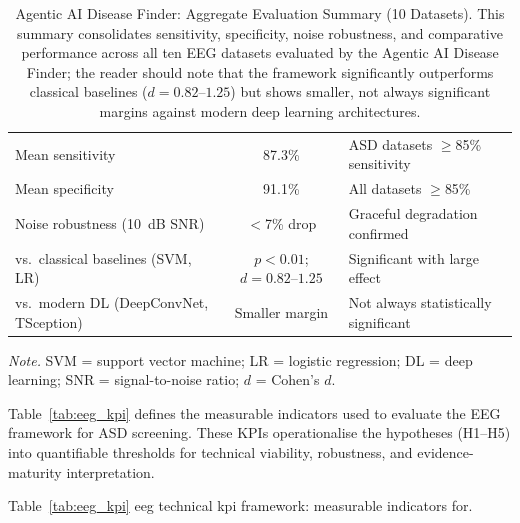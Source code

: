 \begin{table}[!htbp]
\tablestripes\tablefontsize
\caption[Agentic AI Disease Finder: Aggregate Evaluation Summary]{Agentic AI Disease Finder: Aggregate Evaluation Summary (10 Datasets). This summary consolidates sensitivity, specificity, noise robustness, and comparative performance across all ten EEG datasets evaluated by the Agentic AI Disease Finder; the reader should note that the framework significantly outperforms classical baselines ($d = 0.82$--$1.25$) but shows smaller, not always significant margins against modern deep learning architectures.}
\tablefontsize
\begin{tabularx}{\textwidth}{@{} L C L @{}}
\toprule
{} &  &  \\
\midrule
Mean sensitivity & 87.3\% & ASD datasets $\geq$85\% sensitivity \\
\addlinespace
Mean specificity & 91.1\% & All datasets $\geq$85\% \\
\addlinespace
Noise robustness (10~dB SNR) & $<$7\% drop & Graceful degradation confirmed \\
\addlinespace
vs.\ classical baselines (SVM, LR) & $p < 0.01$; $d = 0.82$--$1.25$ & Significant with large effect \\
\addlinespace
vs.\ modern DL (DeepConvNet, TSception) & Smaller margin & Not always statistically significant \\
\bottomrule
\end{tabularx}
\vspace{0.5em}\noindent\textit{Note.} SVM = support vector machine; LR = logistic regression; DL = deep learning; SNR = signal-to-noise ratio; $d$ = Cohen's $d$.
\end{table}


\noindent Table~\ref{tab:eeg_kpi} defines the measurable indicators used to evaluate the EEG framework for ASD screening. These KPIs operationalise the hypotheses (H1--H5) into quantifiable thresholds for technical viability, robustness, and evidence-maturity interpretation.

\iffalse %

\noindent Table~\ref{tab:eeg_kpi} eeg technical kpi framework: measurable indicators for.

